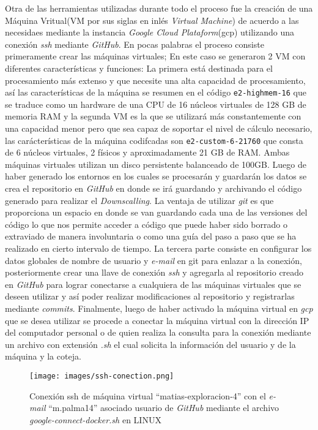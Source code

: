 Otra de las herramientas utilizadas durante todo el proceso fue la creación de una Máquina Vritual(VM por sus siglas en inlés \textit{Virtual Machine}) de acuerdo a las necesidaes mediante la instancia
\textit{Google Cloud Plataform}(gcp) utilizando una conexión \textit{ssh} mediante \textit{GitHub}. En pocas palabras el proceso consiste primeramente crear las máquinas virtuales;
En este caso se generaron 2 VM con diferentes características y funciones: La primera está destinada para el procesamiento más extenso y que necesite una alta capacidad de procesamiento, así
las características de la máquina se resumen en el código \texttt{e2-highmem-16} que se traduce como un hardware de una CPU de 16 núcleos virtuales de 128 GB de memoria RAM y la segunda VM es la que se utilizará
más constantemente con una capacidad menor pero que sea capaz de soportar el nivel de cálculo necesario, las carácterísticas de la máquina codifcadas son \texttt{e2-custom-6-21760} que consta de 6 núcleos virtuales,
2 físicos y aproximadamente 21 GB de RAM. Ambas máquinas virtuales utilizan un disco persistente balanceado de 100GB. Luego de haber generado los entornos en los cuales se procesarán y guardarán los datos se crea el repositorio en \textit{GitHub} en 
donde se irá guardando y archivando el código generado para realizar el \textit{Downscalling}. La ventaja de utilizar \textit{git} es que proporciona un espacio en donde se van guardando cada una de las versiones del código 
lo que nos permite acceder a código que puede haber sido borrado o extraviado de manera involuntaria o como una guía del paso a paso que se ha realizado en cierto intervalo de tiempo.
La tercera parte consiste en configurar los datos globales de nombre de usuario y \textit{e-mail} en git para
enlazar a la conexión, posteriormente crear una llave de conexión \textit{ssh} y agregarla al repositorio creado en \textit{GitHub} para lograr conectarse a cualquiera de las máquinas virtuales que se deseen utilizar y así poder realizar modificaciones 
al repositorio y registrarlas mediante \textit{commits}.
Finalmente, luego de haber activado la máquina virtual en \textit{gcp} que se desea utilizar se procede a conectar la máquina virtual con la dirección IP del computador personal o de quien realiza la consulta para la conexión
mediante un archivo con extensión \textit{.sh} el cual solicita la información del usuario y de la máquina y la coteja.


\begin{figure}[ht]
    \centering
          \texttt{[image: images/ssh-conection.png]}
    \caption[Conexión ssh de máquina virtual]{\footnotesize Conexión ssh de máquina virtual ``matias-exploracion-4'' con el \textit{e-mail} ``m.palma14'' asociado usuario de \textit{GitHub} mediante el archivo \textit{google-connect-docker.sh} en LINUX}
\end{figure}

